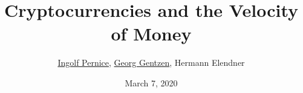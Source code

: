 %
%
%
\title{Cryptocurrencies and the Velocity of Money}%
\author[]{\underline{Ingolf Pernice}, \underline{Georg Gentzen}, Hermann Elendner}%
\date{March 7, 2020}%
%

	\def \varInputTikz {}%
	\titlepage

